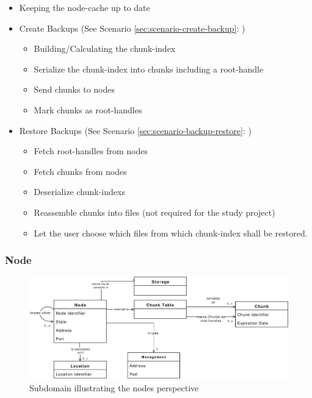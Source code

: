 \begin{itemize}
    \item Keeping the \gls{node-cache} up to date
    \item Create Backups (See Scenario \ref{sec:scenario-create-backup}: )
    \begin{itemize}
        \item Building/Calculating the \gls{chunk-index}
        \item Serialize the \gls{chunk-index} into \glspl{chunk} including a \gls{root-handle}
        \item Send \glspl{chunk} to \glspl{node}
        \item Mark \glspl{chunk} as \glspl{root-handle}
    \end{itemize}
    \item Restore Backups (See Scenario \ref{sec:scenario-backup-restore}: )
    \begin{itemize}
        \item Fetch \glspl{root-handle} from \glspl{node}
        \item Fetch \glspl{chunk} from \glspl{node}
        \item Deserialize \glspl{chunk-index}
        \item Reassemble \glspl{chunk} into \glspl{file} (not required for the study project)
        \item Let the \gls{user} choose which \glspl{file} from which \gls{chunk-index} shall be restored.
    \end{itemize}
\end{itemize}

\subsubsection{Node}\label{sec:component-node}

\begin{figure}[h]
    \centering
    \includegraphics[width=1\linewidth]{resources/node_domain_model}
    \caption[Node Subdomain]{Subdomain illustrating the \glspl{node} perspective}
\end{figure}

